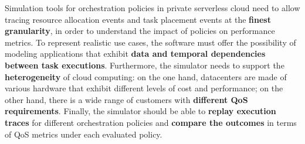 






Simulation tools for orchestration policies in private serverless cloud need to allow tracing resource allocation events and task placement events at the \textbf{finest granularity}, in order to understand the impact of policies on performance metrics. To represent realistic use cases, the software must offer the possibility of modeling applications that exhibit \textbf{data and temporal dependencies between task executions}. Furthermore, the simulator needs to support the \textbf{heterogeneity} of cloud computing: on the one hand, datacenters are made of various hardware that exhibit different levels of cost and performance; on the other hand, there is a wide range of customers with \textbf{different QoS requirements}. Finally, the simulator should be able to \textbf{replay execution traces} for different orchestration policies and \textbf{compare the outcomes} in terms of QoS metrics under each evaluated policy.

